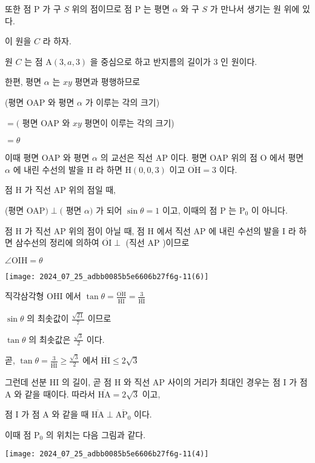 \documentclass[10pt]{article}
\begin{document}
또한 점 P 가 구 $S$ 위의 점이므로 점 P 는 평면 $\alpha$ 와 구 $S$ 가 만나서 생기는 원 위에 있다.

이 원을 $C$ 라 하자.

원 $C$ 는 점 $\mathrm{A}(3, a, 3)$ 을 중심으로 하고 반지름의 길이가 3 인 원이다.

한편, 평면 $\alpha$ 는 $x y$ 평면과 평행하므로

(평면 OAP 와 평면 $\alpha$ 가 이루는 각의 크기)

$=($ 평면 OAP 와 $x y$ 평면이 이루는 각의 크기)

$=\theta$

이때 평면 OAP 와 평면 $\alpha$ 의 교선은 직선 AP 이다. 평면 OAP 위의 점 O 에서 평면 $\alpha$ 에 내린 수선의 발을 H 라 하면 $\mathrm{H}(0,0,3)$ 이고 $\overline{\mathrm{OH}}=3$ 이다.

점 H 가 직선 AP 위의 점일 때,

(평면 OAP$) \perp($ 평면 $\alpha)$ 가 되어 $\sin \theta=1$ 이고, 이때의 점 P 는 $\mathrm{P}_{0}$ 이 아니다.

점 H 가 직선 AP 위의 점이 아닐 때, 점 H 에서 직선 AP 에 내린 수선의 발을 I 라 하면 삼수선의 정리에 의하여 $\overline{\mathrm{OI}} \perp$ (직선 AP )이므로

$\angle \mathrm{OIH}=\theta$

\begin{center}
\texttt{[image: 2024\_07\_25\_adbb0085b5e6606b27f6g-11(6)]}
\end{center}

직각삼각형 OHI 에서 $\tan \theta=\frac{\overline{\mathrm{OH}}}{\overline{\mathrm{HI}}}=\frac{3}{\overline{\mathrm{HI}}}$

$\sin \theta$ 의 최솟값이 $\frac{\sqrt{21}}{7}$ 이므로

$\tan \theta$ 의 최솟값은 $\frac{\sqrt{3}}{2}$ 이다.

곧, $\tan \theta=\frac{3}{\overline{\mathrm{HI}}} \geq \frac{\sqrt{3}}{2}$ 에서 $\overline{\mathrm{HI}} \leq 2 \sqrt{3}$

그런데 선분 HI 의 길이, 곧 점 H 와 직선 AP 사이의 거리가 최대인 경우는 점 I 가 점 A 와 같을 때이다. 따라서 $\overline{\mathrm{HA}}=2 \sqrt{3}$ 이고,

점 I 가 점 A 와 같을 때 $\overline{\mathrm{HA}} \perp \overline{\mathrm{AP}_{0}}$ 이다.

이때 점 $\mathrm{P}_{0}$ 의 위치는 다음 그림과 같다.

\begin{center}
\texttt{[image: 2024\_07\_25\_adbb0085b5e6606b27f6g-11(4)]}
\end{center}
\end{document}
